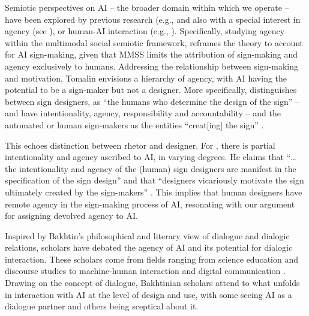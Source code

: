 \documentclass[english]{textolivre}
\begin{document}
Semiotic perspectives on AI – the broader domain within which we operate – have been explored by previous research (e.g., \textcite{matthews2019ai} and also with a special interest in agency (see \textcite{dondero2025aspects}), or human-AI interaction (e.g., \textcite{zappavigna2025emoji}). Specifically, studying agency within the multimodal social semiotic framework, \textcite{tomalin2025multimodal} reframes the theory to account for AI sign-making, given that MMSS limits the attribution of sign-making and agency exclusively to humans. Addressing the relationship between sign-making and motivation, Tomalin envisions a hierarchy of agency, with AI having the potential to be a sign-maker but not a designer. More specifically, \textcite{tomalin2025multimodal} distinguishes between sign designers, as “the humans who determine the design of the sign” – and have intentionality, agency, responsibility and accountability – and the automated or human sign-makers as the entities “creat[ing] the sign” \cite[p. 235]{tomalin2025multimodal}.

This echoes  distinction between rhetor and designer. For \textcite{tomalin2025multimodal}, there is partial intentionality and agency ascribed to AI, in varying degrees. He claims that “… the intentionality and agency of the (human) sign designers are manifest in the specification of the sign design” and that “designers vicariously motivate the sign ultimately created by the sign-makers” \cite[p. 239-40]{tomalin2025multimodal}. This implies that human designers have remote agency in the sign-making process of AI, resonating with our argument for assigning devolved agency to AI.

Inspired by Bakhtin’s philosophical and literary view of dialogue and dialogic relations, scholars have debated the agency of AI and its potential for dialogic interaction. These scholars come from fields ranging from science education \cite{tang2025dialogic} and discourse studies \cite{duquepereira2025chatbots} to machine-human interaction and digital communication \cite{karimova2025dialogic}. Drawing on the concept of dialogue, Bakhtinian scholars attend to what unfolds in interaction with AI at the level of design and use, with some seeing AI as a dialogue partner and others being sceptical about it.
\end{document}
